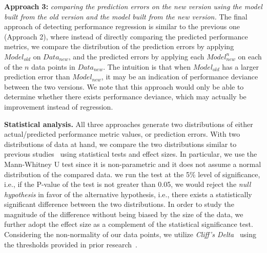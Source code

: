 \noindent\textbf{Approach 3: }\emph{comparing the prediction errors on the new version using the model built from the old version and the model built from the new version.}
The final approach of detecting performance regression is similar to the previous one (Approach 2), where instead of directly comparing the predicted performance metrics, we compare the distribution of the prediction errors by applying $Model_{old}$ on $Data_{new}$, and the predicted errors by applying each $Model_{new}^n$ on each of the $n$ data points in $Data_{new}$. The intuition is that when $Model_{old}$ has a larger prediction error than $Model_{new}$, it may be an indication of performance deviance between the two versions. We note that this approach would only be able to determine whether there exists performance deviance, which may actually be improvement instead of regression. 


\noindent\textbf{Statistical analysis.}
All three approaches generate two distributions of either actual/predicted performance metric values, or prediction errors. With two distributions of data at hand, we compare the two distributions similar to previous studies~\citep{Chen:2016:CHD:2950290.2950303} using statistical tests and effect sizes. In particular, we use the Mann-Whitney U test since it is non-parametric and it does not assume a normal distribution of the compared data. we run the test at the 5\% level of significance, i.e., if the P-value of the test is not greater than 0.05, we would reject the \emph{null hypothesis} in favor of the alternative hypothesis, i.e., there exists a statistically significant difference between the two distributions. In order to study the magnitude of the difference without being biased by the size of the data, we further adopt the effect size as a complement
of the statistical significance test. Considering the non-normality of our data points, we
utilize \emph{Cliff's Delta}~\citep{cliff1996ordinal} using the
thresholds provided in prior research~\citep{romano2006appropriate}.


